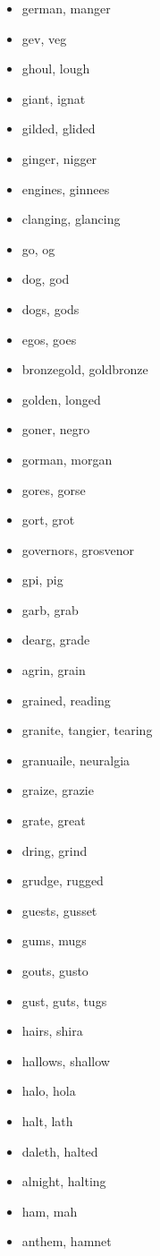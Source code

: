 \documentclass[a4wide,11pt]{report}
\begin{document}
\begin{itemize}
  \item german, manger
  \item gev, veg
  \item ghoul, lough
  \item giant, ignat
  \item gilded, glided
  \item ginger, nigger
  \item engines, ginnees
  \item clanging, glancing
  \item go, og
  \item dog, god
  \item dogs, gods
  \item egos, goes
  \item bronzegold, goldbronze
  \item golden, longed
  \item goner, negro
  \item gorman, morgan
  \item gores, gorse
  \item gort, grot
  \item governors, grosvenor
  \item gpi, pig
  \item garb, grab
  \item dearg, grade
  \item agrin, grain
  \item grained, reading
  \item granite, tangier, tearing
  \item granuaile, neuralgia
  \item graize, grazie
  \item grate, great
  \item dring, grind
  \item grudge, rugged
  \item guests, gusset
  \item gums, mugs
  \item gouts, gusto
  \item gust, guts, tugs
  \item hairs, shira
  \item hallows, shallow
  \item halo, hola
  \item halt, lath
  \item daleth, halted
  \item alnight, halting
  \item ham, mah
  \item anthem, hamnet

\end{itemize}
\end{document}
